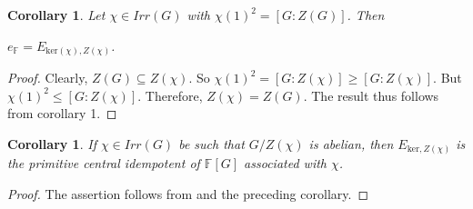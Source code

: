 \documentclass[12pt, reqno]{amsart}
\numberwithin{equation}{section}
\theoremstyle{definition}
\theoremstyle{remark}
\theoremstyle{plain}
\newtheorem{corollary}[definition]{Corollary}
\begin{document}
\begin{corollary}
  Let $\chi\in Irr(G)$ with $\chi(1)^2=[G:Z(G)]$. Then 
  \begin{center}
    $e_{\mathbb{F}}=E_{\text{ker}(\chi),Z(\chi)}$.
  \end{center}
\end{corollary}
\begin{proof}
  Clearly, $Z(G)\subseteq Z(\chi)$. So $\chi(1)^2=[G:Z(\chi)]\geq[G:Z(\chi)]$. But $\chi(1)^2\leq[G:Z(\chi)]$. Therefore, $Z(\chi)=Z(G)$. The result thus follows from corollary 1.
\end{proof}
\begin{corollary}\label{I:idempotent}
If $\chi\in Irr(G)$ be such that $G/Z(\chi)$ is abelian, then $E_{\text{ker},Z(\chi)}$ is the primitive central idempotent of $\mathbb{F}[G]$ associated with $\chi$.
\end{corollary}
\begin{proof}
The assertion follows from \cite{Isaacs} and the preceding corollary.
\end{proof} 
\end{document}
